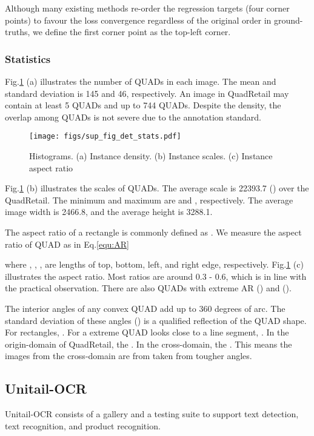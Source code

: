 \documentclass[runningheads]{llncs}
\begin{document}
Although many existing methods \cite{RIDet,RSDet,EAST} re-order the regression targets (four corner points) to favour the loss convergence regardless of the original order in ground-truths, we define the first corner point  as the top-left corner.

\subsubsection{Statistics}
Fig.\ref{fig:sup_fig_det_stats} (a) illustrates the number of QUADs in each image. The mean and standard deviation is 145 and 46, respectively. An image in QuadRetail may contain at least 5 QUADs and up to 744 QUADs. Despite the density, the overlap among QUADs is not severe due to the annotation standard. 

\begin{figure}[t]
    \centering
    \texttt{[image: figs/sup\_fig\_det\_stats.pdf]}
    \caption{Histograms. (a) Instance density. (b) Instance scales. (c) Instance aspect ratio}
    \label{fig:sup_fig_det_stats}
\end{figure}

Fig.\ref{fig:sup_fig_det_stats} (b) illustrates the scales of QUADs. The average scale is 22393.7 () over the QuadRetail. The minimum and maximum are  and , respectively. The average image width is 2466.8, and the average height is 3288.1. 

The aspect ratio of a rectangle is commonly defined as . We measure the aspect ratio of QUAD as in Eq.\ref{equ:AR}



\noindent where , , ,  are lengths of top, bottom, left, and right edge, respectively. Fig.\ref{fig:sup_fig_det_stats} (c) illustrates the aspect ratio. Most ratios are around 0.3 - 0.6, which is in line with the practical observation. There are also QUADs with extreme AR () and ().

The interior angles of any convex QUAD add up to 360 degrees of arc. The standard deviation of these angles () is a qualified reflection of the QUAD shape. For rectangles, . For a extreme QUAD looks close to a line segment, . In the origin-domain of QuadRetail, the . In the cross-domain, the . This means the images from the cross-domain are from taken from tougher angles.

\subsection{Unitail-OCR}
Unitail-OCR consists of a gallery and a testing suite to support text detection, text recognition, and product recognition.
\end{document}
